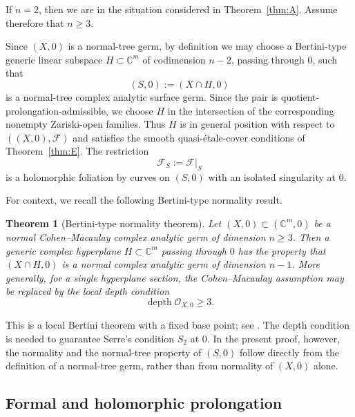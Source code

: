 \documentclass[11pt,twoside]{amsart}
\newcommand{\C}{\mathbb C}
\newcommand{\F}{\mathcal F}
\newtheorem{teo}{Theorem}
\theoremstyle{definition}
\begin{document}
If $n=2$, then we are in the situation considered in
Theorem~\ref{thm:A}. Assume therefore that $n\geq3$.

Since $(X,0)$ is a normal-tree germ, by definition we may choose a
Bertini-type generic linear subspace $H\subset\C^m$ of codimension
$n-2$, passing through $0$, such that
\[
(S,0):=(X\cap H,0)
\]
is a normal-tree complex analytic surface germ. Since the pair is
quotient-prolongation-admissible, we choose $H$ in the intersection of the
corresponding nonempty Zariski-open families. Thus $H$ is in general position
with respect to $((X,0),\F)$ and satisfies the smooth
quasi-\'etale-cover conditions of Theorem~\ref{thm:E}. The restriction
\[
\F_S:=\F|_S
\]
is a holomorphic foliation by curves on $(S,0)$ with an isolated
singularity at $0$.

For context, we recall the following Bertini-type normality result.

\begin{teo}[Bertini-type normality theorem]\normalfont
Let $(X,0)\subset(\C^m,0)$ be a normal Cohen--Macaulay complex
analytic germ of dimension $n\geq3$. Then a generic complex hyperplane
$H\subset\C^m$ passing through $0$ has the property that
$(X\cap H,0)$ is a normal complex analytic germ of dimension $n-1$.
More generally, for a single hyperplane section, the
Cohen--Macaulay assumption may be replaced by the local depth
condition
\[
\operatorname{depth}\mathcal O_{X,0}\geq3.
\]
\end{teo}

This is a local Bertini theorem with a fixed base point; see
\cite{Flenner1977,Manaresi1982}. The depth condition is needed to guarantee
Serre's condition $S_2$ at $0$. In the present proof, however, the
normality and the normal-tree property of $(S,0)$ follow directly
from the definition of a normal-tree germ, rather than from normality
of $(X,0)$ alone.

\subsection{Formal and holomorphic prolongation}
\end{document}
